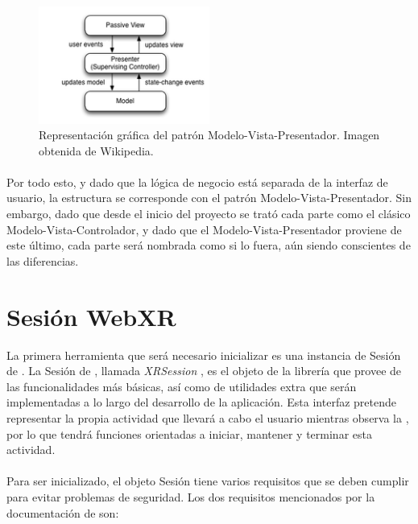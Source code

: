\documentclass{subfiles}
\begin{document}
        \begin{figure}
        \centering
        \includegraphics[width=0.5\textwidth]{img/mvp.png}
        \caption{Representación gráfica del patrón Modelo-Vista-Presentador. Imagen obtenida de Wikipedia.}
        \label{fig:mvp}
        \end{figure}

        \paragraph{}
        Por todo esto, y dado que la lógica de negocio está separada de la interfaz de usuario, la estructura se corresponde con el patrón Modelo-Vista-Presentador. Sin embargo, dado que desde el inicio del proyecto se trató cada parte como el clásico Modelo-Vista-Controlador, y dado que el Modelo-Vista-Presentador proviene de este último, cada parte será nombrada como si lo fuera, aún siendo conscientes de las diferencias.

        \section{Sesión WebXR}
        \label{sec:2.2}

        La primera herramienta que será necesario inicializar es una instancia de Sesión de \webxr. La Sesión de \webxr, llamada \textit{XRSession} \cite{web:xrsession}, es el objeto de la librería \webxr que provee de las funcionalidades más básicas, así como de utilidades extra que serán implementadas a lo largo del desarrollo de la aplicación. Esta interfaz pretende representar la propia actividad que llevará a cabo el usuario mientras observa la \ra, por lo que tendrá funciones orientadas a iniciar, mantener y terminar esta actividad.

        \paragraph{}
        Para ser inicializado, el objeto Sesión tiene varios requisitos que se deben cumplir \cite{web:webxrrequirements} para evitar problemas de seguridad. Los dos requisitos mencionados por la documentación de \arcore son:
\end{document}
